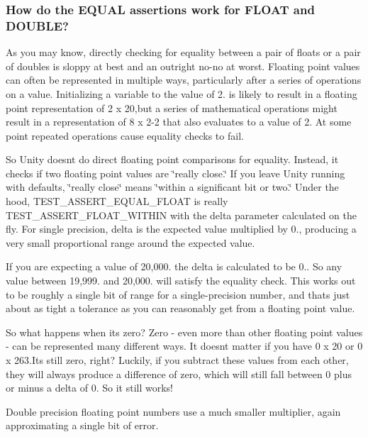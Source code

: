 \subsubsection*{How do the E\+Q\+U\+AL assertions work for F\+L\+O\+AT and D\+O\+U\+B\+LE?}

As you may know, directly checking for equality between a pair of floats or a pair of doubles is sloppy at best and an outright no-\/no at worst. Floating point values can often be represented in multiple ways, particularly after a series of operations on a value. Initializing a variable to the value of 2. is likely to result in a floating point representation of 2 x 20,but a series of mathematical operations might result in a representation of 8 x 2-\/2 that also evaluates to a value of 2. At some point repeated operations cause equality checks to fail.

So Unity doesn\textquotesingle{}t do direct floating point comparisons for equality. Instead, it checks if two floating point values are \char`\"{}really close.\char`\"{} If you leave Unity running with defaults, \char`\"{}really close\char`\"{} means \char`\"{}within a significant bit or two.\char`\"{} Under the hood, {\ttfamily T\+E\+S\+T\+\_\+\+A\+S\+S\+E\+R\+T\+\_\+\+E\+Q\+U\+A\+L\+\_\+\+F\+L\+O\+AT} is really {\ttfamily T\+E\+S\+T\+\_\+\+A\+S\+S\+E\+R\+T\+\_\+\+F\+L\+O\+A\+T\+\_\+\+W\+I\+T\+H\+IN} with the {\ttfamily delta} parameter calculated on the fly. For single precision, delta is the expected value multiplied by 0., producing a very small proportional range around the expected value.

If you are expecting a value of 20,000. the delta is calculated to be 0.. So any value between 19,999. and 20,000. will satisfy the equality check. This works out to be roughly a single bit of range for a single-\/precision number, and that\textquotesingle{}s just about as tight a tolerance as you can reasonably get from a floating point value.

So what happens when it\textquotesingle{}s zero? Zero -\/ even more than other floating point values -\/ can be represented many different ways. It doesn\textquotesingle{}t matter if you have 0 x 20 or 0 x 263.\+It\textquotesingle{}s still zero, right? Luckily, if you subtract these values from each other, they will always produce a difference of zero, which will still fall between 0 plus or minus a delta of 0. So it still works!

Double precision floating point numbers use a much smaller multiplier, again approximating a single bit of error.

